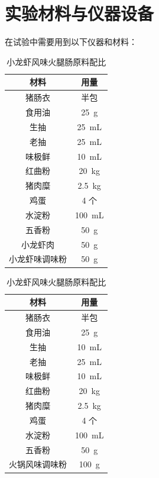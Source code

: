 \documentclass[UTF8]{ctexart}
\begin{document}
	\newpage

	\section{实验材料与仪器设备}
	在试验中需要用到以下仪器和材料：

	\begin{table}[!htb]
        \begin{minipage}[h]{0.36\linewidth}
            \centering
			\caption{小龙虾风味火腿肠原料配比}
                \begin{tabular}{cc}
					\toprule
					材料 & 用量\\
					\midrule
					猪肠衣	&	半包\\
					食用油	&	25~g\\
					生抽	&	25~mL\\
					老抽	&	25~mL\\
					味极鲜	&	10~mL\\
					红曲粉	&	20~kg\\
					猪肉糜	&	2.5~kg\\
					鸡蛋	&	4 个\\
					水淀粉	&	100~mL\\
					五香粉	&	50~g\\
					小龙虾肉 &	50~g\\
					小龙虾味调味粉 &	50~g\\
					\bottomrule
				\end{tabular}
        \end{minipage}
        \begin{minipage}[h]{0.36\linewidth}
            \centering
			\caption{小龙虾风味火腿肠原料配比}
			\begin{tabular}{cc}
				\toprule
				材料 & 用量\\
				\midrule
				猪肠衣	&	半包\\
				食用油	&	25~g\\
				生抽	&	10~mL\\
				老抽	&	25~mL\\
				味极鲜	&	10~mL\\
				红曲粉	&	20~kg\\
				猪肉糜	&	2.5~kg\\
				鸡蛋	&	4 个\\
				水淀粉	&	100~mL\\
				五香粉	&	50~g\\
				火锅风味调味粉 &	100~g\\
				\bottomrule
			\end{tabular}

\end{minipage}
\end{table}
\end{document}
